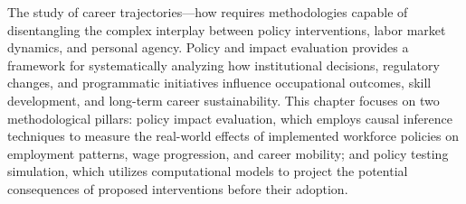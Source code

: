 \documentclass[./main.tex]{subfiles}
\begin{document}
The study of career trajectories—how requires methodologies capable of disentangling the complex interplay between policy interventions, labor market dynamics, and personal agency. Policy and impact evaluation provides a framework for systematically analyzing how institutional decisions, regulatory changes, and programmatic initiatives influence occupational outcomes, skill development, and long-term career sustainability. This chapter focuses on two methodological pillars: policy impact evaluation, which employs causal inference techniques to measure the real-world effects of implemented workforce policies on employment patterns, wage progression, and career mobility; and policy testing simulation, which utilizes computational models to project the potential consequences of proposed interventions before their adoption.
\end{document}
